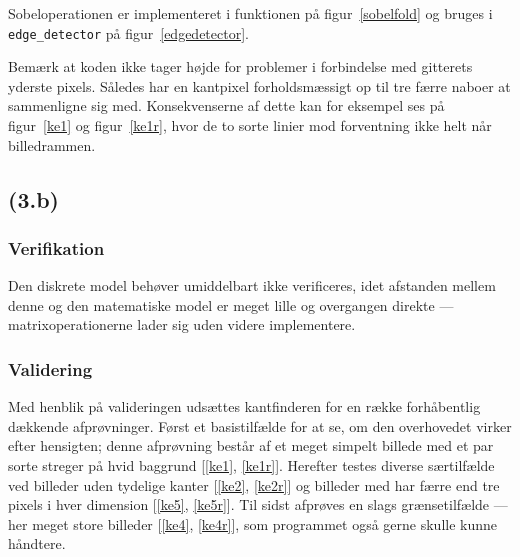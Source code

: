 \documentclass{article}
\begin{document}
Sobeloperationen er implementeret i funktionen på figur~\ref{sobelfold} og bruges i {\tt edge\_detector} på figur~\ref{edgedetector}.

Bemærk at koden ikke tager højde for problemer i forbindelse med gitterets yderste pixels. Således har en kantpixel forholdsmæssigt op til tre færre naboer at sammenligne sig med. Konsekvenserne af dette kan for eksempel ses på figur~\ref{ke1} og figur~\ref{ke1r}, hvor de to sorte linier mod forventning ikke helt når billedrammen.

\subsection*{(3.b)}

\subsubsection*{Verifikation}

Den diskrete model behøver umiddelbart ikke verificeres, idet afstanden mellem denne og den matematiske model er meget lille og overgangen direkte --- matrixoperationerne lader sig uden videre implementere.

\subsubsection*{Validering}
Med henblik på valideringen udsættes kantfinderen for en række forhåbentlig dækkende afprøvninger. Først et basistilfælde for at se, om den overhovedet virker efter hensigten; denne afprøvning består af et meget simpelt billede med et par sorte streger på hvid baggrund [\ref{ke1}, \ref{ke1r}]. Herefter testes diverse særtilfælde ved billeder uden tydelige kanter [\ref{ke2}, \ref{ke2r}] og billeder med har færre end tre pixels i hver dimension [\ref{ke5}, \ref{ke5r}]. Til sidst afprøves en slags grænsetilfælde --- her meget store billeder [\ref{ke4}, \ref{ke4r}], som programmet også gerne skulle kunne håndtere.
\end{document}
